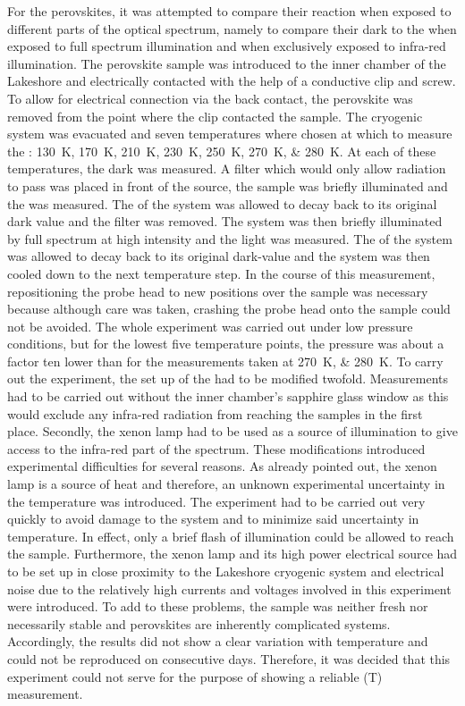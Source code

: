For the perovskites, it was attempted to compare their reaction when exposed to different parts of the optical spectrum, namely to compare their dark \cpd{} to the \cpd{} when exposed to full spectrum illumination and when exclusively exposed to infra-red illumination. The perovskite sample was introduced to the inner chamber of the Lakeshore and electrically contacted with the help of a conductive clip and screw. To allow for electrical connection via the back contact, the perovskite was removed from the point where the clip contacted the sample. The cryogenic system was evacuated and seven temperatures where chosen at which to measure the \cpd{}: \SIlist{130;170;210;230;250;270;280}{\kelvin}. At each of these temperatures, the dark \cpd{} was measured. A filter which would only allow \ir{} radiation to pass was placed in front of the source, the sample was briefly illuminated and the \ir{} \cpd{} was measured. The \cpd{} of the system was allowed to decay back to its original dark value and the filter was removed. The system was then briefly illuminated by full spectrum at high intensity and the light \cpd{} was measured. The \cpd{} of the system was allowed to decay back to its original dark-value and the system was then cooled down to the next temperature step. In the course of this measurement, repositioning the probe head to new positions over the sample was necessary because although care was taken, crashing the probe head onto the sample could not be avoided. The whole experiment was carried out under low pressure conditions, but for the lowest five temperature points, the pressure was about a factor ten lower than for the measurements taken at \SIlist{270;280}{\kelvin}. To carry out the experiment, the set up of the \McA{} had to be modified twofold. Measurements had to be carried out without the inner chamber's sapphire glass window as this would exclude any infra-red radiation from reaching the samples in the first place. Secondly, the xenon lamp had to be used as a source of illumination to give access to the infra-red part of the spectrum. These modifications introduced experimental difficulties for several reasons. As already pointed out, the xenon lamp is a source of heat and therefore, an unknown experimental uncertainty in the temperature was introduced. The experiment had to be carried out very quickly to avoid damage to the system and to minimize said uncertainty in temperature. In effect, only a brief flash of illumination could be allowed to reach the sample. Furthermore, the xenon lamp and its high power electrical source had to be set up in close proximity to the Lakeshore cryogenic system and electrical noise due to the relatively high currents and voltages involved in this experiment were introduced. To add to these problems, the sample was neither fresh nor necessarily stable and perovskites are inherently complicated systems. Accordingly, the results did not show a clear variation with temperature and could not be reproduced on consecutive days. Therefore, it was decided that this experiment could not serve for the purpose of showing a reliable \spv{}(T) measurement.\\

